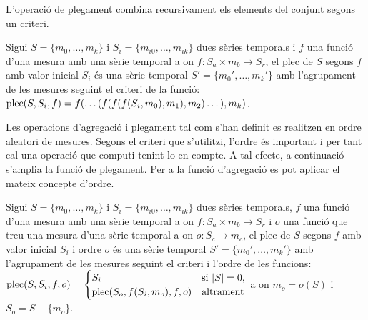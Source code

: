 

L'operació de plegament combina recursivament els elements del conjunt
segons un criteri.
\begin{definition}[plec]
  Sigui $S=\{m_0, \dotsc, m_k\}$ i $S_i=\{m_{i0}, \dotsc, m_{ik}\}$
  dues sèries temporals i $f$ una funció d'una mesura amb una sèrie
  temporal a on $f: S_a \times m_b \mapsto S_r$, el plec de $S$ segons
  $f$ amb valor inicial $S_i$ és una sèrie temporal $S'= \{m_0',
  \dotsc, m_k'\}$ amb l'agrupament de les mesures seguint el criteri
  de la funció: $\operatorname*{plec}(S,S_i,f) = f(\dots(
  f(f(f(S_i,m_0),m_1),\allowbreak m_2 )\dots),\allowbreak m_k)$.
\end{definition}


Les operacions d'agregació i plegament tal com s'han definit es
realitzen en ordre aleatori de mesures. Segons el criteri que
s'utilitzi, l'ordre és important i per tant cal una operació que
computi tenint-lo en compte. A tal efecte, a continuació s'amplia la
funció de plegament. Per a la funció d'agregació es pot aplicar el
mateix concepte d'ordre.
\begin{definition}
  Sigui $S=\{m_0, \dotsc, m_k\}$ i $S_i=\{m_{i0}, \dotsc, m_{ik}\}$
  dues sèries temporals, $f$ una funció d'una mesura amb una sèrie
  temporal a on $f: S_a \times m_b \mapsto S_r$ i $o$ una funció que
  treu una mesura d'una sèrie temporal a on $o: S_c \mapsto m_c$, el
  plec de $S$ segons $f$ amb valor inicial $S_i$ i ordre $o$ és una
  sèrie temporal $S'= \{m_0', \dotsc, m_k'\}$ amb l'agrupament de les
  mesures seguint el criteri i l'ordre de les funcions:
  $\operatorname*{plec}(S,S_i,f,o) =
  \begin{cases}
    S_i & \text{si } |S|=0, \\
    \operatorname*{plec}(S_o,f(S_i,m_o),f,o) & \text{altrament}
  \end{cases}$ a on $m_o = o(S)$ i $S_o = S - \{m_o\}$.
\end{definition}

